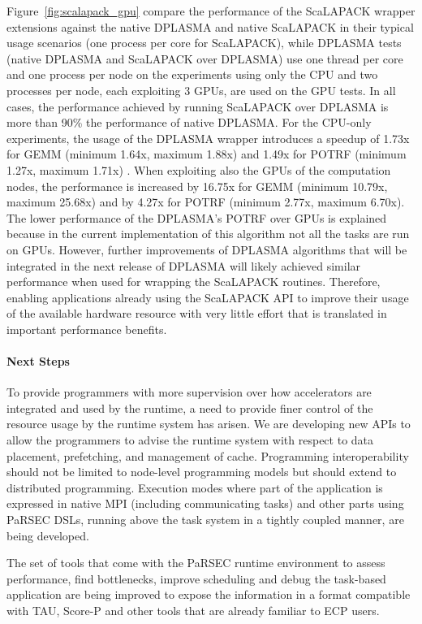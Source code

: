 Figure~\ref{fig:scalapack_gpu} compare the
performance of the ScaLAPACK wrapper extensions against the native
DPLASMA and native ScaLAPACK in their typical usage scenarios (one
process per core for ScaLAPACK),
while DPLASMA tests (native DPLASMA and ScaLAPACK over DPLASMA) use
one thread per core and one process per node on the experiments using
only the CPU and two processes per node, each exploiting 3 GPUs, are
used on the GPU tests.
%
In all cases, the performance achieved by running ScaLAPACK over
DPLASMA is more than 90\% the performance of native DPLASMA.  For the
CPU-only experiments, the usage of the DPLASMA wrapper introduces a
speedup of 1.73x for GEMM (minimum 1.64x, maximum 1.88x) and 1.49x for
POTRF (minimum 1.27x, maximum 1.71x) .  When exploiting also the GPUs
of the computation nodes, the performance is increased by 16.75x for
GEMM (minimum 10.79x, maximum 25.68x) and by 4.27x for POTRF (minimum
2.77x, maximum 6.70x).  The lower performance of the DPLASMA's POTRF
over GPUs is explained because in the current implementation of this
algorithm not all the tasks are run on GPUs. However, further
improvements of DPLASMA algorithms that will be integrated in the next
release of DPLASMA will likely achieved similar performance when used
for wrapping the ScaLAPACK routines. Therefore, enabling applications
already using the ScaLAPACK API to improve their usage of the
available hardware resource with very little effort that is translated
in important performance benefits.

%
%

\paragraph{Next Steps}
To provide programmers with more supervision over how accelerators are
integrated and used by the runtime, a need to provide finer control of the
resource usage by the runtime system has arisen. We are developing new APIs to
allow the programmers to advise the runtime system with respect to data
placement, prefetching, and management of cache.
%
Programming interoperability should not be limited to node-level programming
models but should extend to distributed programming. Execution modes where part
of the application is expressed in native MPI (including communicating tasks)
and other parts using PaRSEC DSLs, running above the task system in a tightly
coupled manner, are being developed.


The set of tools that come with the PaRSEC runtime environment to
assess performance, find bottlenecks, improve scheduling and debug the
task-based application are being improved to expose the information
in a format compatible with TAU, Score-P and other
tools that are already familiar to ECP users.
